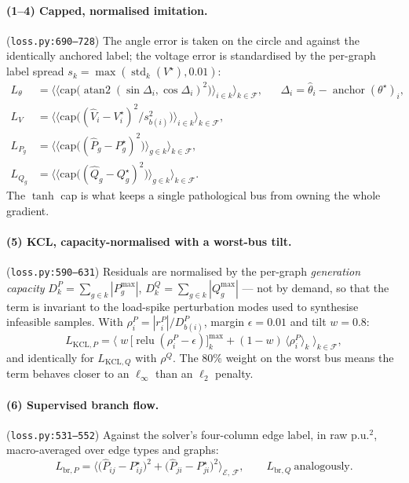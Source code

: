 \documentclass[11pt]{article}
\newcommand{\pred}[1]{\widehat{#1}}
\newcommand{\code}[1]{\texttt{\small #1}}
\newcommand{\relu}{\operatorname{relu}}
\DeclareMathOperator*{\amax}{max}
\begin{document}
\paragraph{(1--4) Capped, normalised imitation.}
(\code{loss.py:690--728}) The angle error is taken on the circle and against the identically
anchored label; the voltage error is standardised by the per-graph label spread
$s_k=\max(\operatorname{std}_k(V^\star),0.01)$:
\begin{align}
L_\theta&=\Big\langle\Big\langle \mathrm{cap}\big(\operatorname{atan2}(\sin\Delta_i,\cos\Delta_i)^2\big)\Big\rangle_{i\in k}\Big\rangle_{k\in\mathcal{F}},
&&\Delta_i=\pred\theta_i-\operatorname{anchor}(\theta^\star)_i,
\label{eq:sfm-Ltheta}\\
L_V&=\Big\langle\Big\langle \mathrm{cap}\big((\pred{V}_i-V^\star_i)^2/s_{b(i)}^2\big)\Big\rangle_{i\in k}\Big\rangle_{k\in\mathcal{F}},
\label{eq:sfm-LV}\\
L_{P_g}&=\Big\langle\Big\langle \mathrm{cap}\big((\pred{P}_g-P^\star_g)^2\big)\Big\rangle_{g\in k}\Big\rangle_{k\in\mathcal{F}},
\label{eq:sfm-Lpq}\\
L_{Q_g}&=\Big\langle\Big\langle \mathrm{cap}\big((\pred{Q}_g-Q^\star_g)^2\big)\Big\rangle_{g\in k}\Big\rangle_{k\in\mathcal{F}} .
\label{eq:sfm-Lqg}
\end{align}
The $\tanh$ cap is what keeps a single pathological bus from owning the whole gradient.

\paragraph{(5) KCL, capacity-normalised with a worst-bus tilt.}
(\code{loss.py:590--631}) Residuals are normalised by the per-graph \emph{generation
capacity} $D^P_k=\sum_{g\in k}|P^{\max}_g|$, $D^Q_k=\sum_{g\in k}|Q^{\max}_g|$ --- not by
demand, so that the term is invariant to the load-spike perturbation modes used to
synthesise infeasible samples. With $\rho^P_i=|r^P_i|/D^P_{b(i)}$, margin
$\epsilon=0.01$ and tilt $w=0.8$:
\begin{equation}
\boxed{\;
L_{\mathrm{KCL},P}
=\Big\langle\;
w\,\big[\relu(\rho^P_i-\epsilon)\big]^{\amax}_k
+(1-w)\,\big\langle \rho^P_i\big\rangle_k
\;\Big\rangle_{k\in\mathcal{F}} ,
\;}
\label{eq:sfm-kcl}
\end{equation}
and identically for $L_{\mathrm{KCL},Q}$ with $\rho^Q$. The $80\%$ weight on the worst bus
means the term behaves closer to an $\ell_\infty$ than an $\ell_2$ penalty.

\paragraph{(6) Supervised branch flow.}
(\code{loss.py:531--552}) Against the solver's four-column edge label, in raw p.u.$^2$,
macro-averaged over edge types and graphs:
\begin{equation}
L_{\mathrm{br},P}=\Big\langle\big(\pred{P}_{ij}-P^\star_{ij}\big)^2+\big(\pred{P}_{ji}-P^\star_{ji}\big)^2\Big\rangle_{\mathcal{E},\,\mathcal{F}},
\qquad
L_{\mathrm{br},Q}\ \text{analogously}.
\label{eq:sfm-br}
\end{equation}
\end{document}
